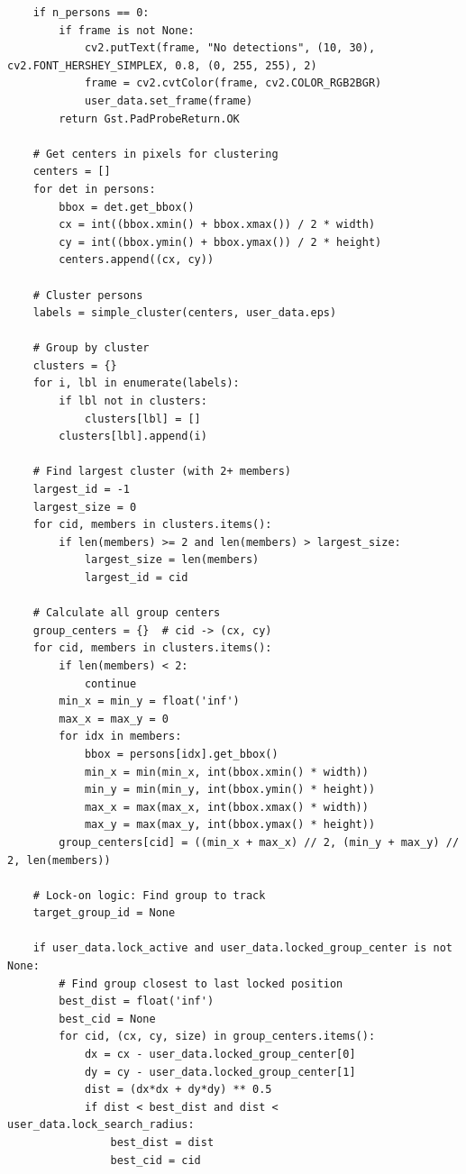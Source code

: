 \documentclass[11pt,a4paper]{article}
\begin{document}
\begin{lstlisting}
    if n_persons == 0:
        if frame is not None:
            cv2.putText(frame, "No detections", (10, 30), cv2.FONT_HERSHEY_SIMPLEX, 0.8, (0, 255, 255), 2)
            frame = cv2.cvtColor(frame, cv2.COLOR_RGB2BGR)
            user_data.set_frame(frame)
        return Gst.PadProbeReturn.OK
    
    # Get centers in pixels for clustering
    centers = []
    for det in persons:
        bbox = det.get_bbox()
        cx = int((bbox.xmin() + bbox.xmax()) / 2 * width)
        cy = int((bbox.ymin() + bbox.ymax()) / 2 * height)
        centers.append((cx, cy))
    
    # Cluster persons
    labels = simple_cluster(centers, user_data.eps)
    
    # Group by cluster
    clusters = {}
    for i, lbl in enumerate(labels):
        if lbl not in clusters:
            clusters[lbl] = []
        clusters[lbl].append(i)
    
    # Find largest cluster (with 2+ members)
    largest_id = -1
    largest_size = 0
    for cid, members in clusters.items():
        if len(members) >= 2 and len(members) > largest_size:
            largest_size = len(members)
            largest_id = cid
    
    # Calculate all group centers
    group_centers = {}  # cid -> (cx, cy)
    for cid, members in clusters.items():
        if len(members) < 2:
            continue
        min_x = min_y = float('inf')
        max_x = max_y = 0
        for idx in members:
            bbox = persons[idx].get_bbox()
            min_x = min(min_x, int(bbox.xmin() * width))
            min_y = min(min_y, int(bbox.ymin() * height))
            max_x = max(max_x, int(bbox.xmax() * width))
            max_y = max(max_y, int(bbox.ymax() * height))
        group_centers[cid] = ((min_x + max_x) // 2, (min_y + max_y) // 2, len(members))
    
    # Lock-on logic: Find group to track
    target_group_id = None
    
    if user_data.lock_active and user_data.locked_group_center is not None:
        # Find group closest to last locked position
        best_dist = float('inf')
        best_cid = None
        for cid, (cx, cy, size) in group_centers.items():
            dx = cx - user_data.locked_group_center[0]
            dy = cy - user_data.locked_group_center[1]
            dist = (dx*dx + dy*dy) ** 0.5
            if dist < best_dist and dist < user_data.lock_search_radius:
                best_dist = dist
                best_cid = cid
        

\end{lstlisting}
\end{document}
